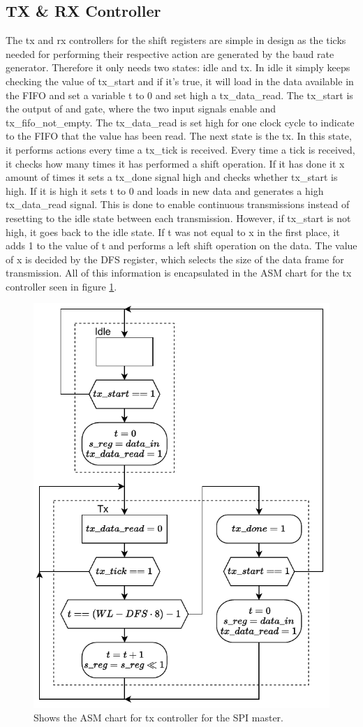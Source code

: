 \documentclass[./dissertation.tex]{subfiles}
\begin{document}
\subsection{TX \& RX Controller}
The tx and rx controllers for the shift registers are simple in design as the ticks needed for performing their respective action are generated by the baud rate generator. Therefore it only needs two states: idle and tx. In idle it simply keeps checking the value of tx\_start and if it's true, it will load in the data available in the FIFO and set a variable t to 0 and set high a tx\_data\_read. The tx\_start is the output of and gate, where the two input signals enable and tx\_fifo\_not\_empty. The tx\_data\_read is set high for one clock cycle to indicate to the FIFO that the value has been read. The next state is the tx. In this state, it performs actions every time a tx\_tick is received. Every time a tick is received, it checks how many times it has performed a shift operation. If it has done it x amount of times it sets a tx\_done signal high and checks whether tx\_start is high. If it is high it sets t to 0 and loads in new data and generates a high tx\_data\_read signal. This is done to enable continuous transmissions instead of resetting to the idle state between each transmission. However, if tx\_start is not high, it goes back to the idle state. If t was not equal to x in the first place, it adds 1 to the value of t and performs a left shift operation on the data. The value of x is decided by the DFS register, which selects the size of the data frame for transmission. All of this information is encapsulated in the ASM chart for the tx controller seen in figure \ref{fig:spi_txctrl}.  
\begin{figure}[H]
    \centering
    \includegraphics[width=0.5\linewidth]{subfiles/imgs/IP_Blocks_Pics/spi_txctrl.drawio.pdf}
    \caption{Shows the ASM chart for tx controller for the SPI master.}
    \label{fig:spi_txctrl}
\end{figure}
\end{document}
